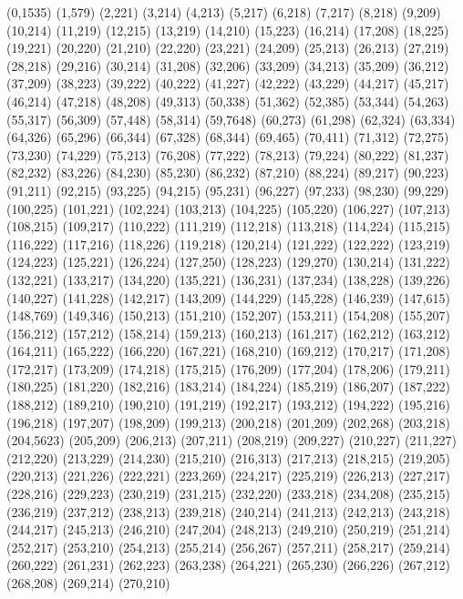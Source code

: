 (0,1535)
(1,579)
(2,221)
(3,214)
(4,213)
(5,217)
(6,218)
(7,217)
(8,218)
(9,209)
(10,214)
(11,219)
(12,215)
(13,219)
(14,210)
(15,223)
(16,214)
(17,208)
(18,225)
(19,221)
(20,220)
(21,210)
(22,220)
(23,221)
(24,209)
(25,213)
(26,213)
(27,219)
(28,218)
(29,216)
(30,214)
(31,208)
(32,206)
(33,209)
(34,213)
(35,209)
(36,212)
(37,209)
(38,223)
(39,222)
(40,222)
(41,227)
(42,222)
(43,229)
(44,217)
(45,217)
(46,214)
(47,218)
(48,208)
(49,313)
(50,338)
(51,362)
(52,385)
(53,344)
(54,263)
(55,317)
(56,309)
(57,448)
(58,314)
(59,7648)
(60,273)
(61,298)
(62,324)
(63,334)
(64,326)
(65,296)
(66,344)
(67,328)
(68,344)
(69,465)
(70,411)
(71,312)
(72,275)
(73,230)
(74,229)
(75,213)
(76,208)
(77,222)
(78,213)
(79,224)
(80,222)
(81,237)
(82,232)
(83,226)
(84,230)
(85,230)
(86,232)
(87,210)
(88,224)
(89,217)
(90,223)
(91,211)
(92,215)
(93,225)
(94,215)
(95,231)
(96,227)
(97,233)
(98,230)
(99,229)
(100,225)
(101,221)
(102,224)
(103,213)
(104,225)
(105,220)
(106,227)
(107,213)
(108,215)
(109,217)
(110,222)
(111,219)
(112,218)
(113,218)
(114,224)
(115,215)
(116,222)
(117,216)
(118,226)
(119,218)
(120,214)
(121,222)
(122,222)
(123,219)
(124,223)
(125,221)
(126,224)
(127,250)
(128,223)
(129,270)
(130,214)
(131,222)
(132,221)
(133,217)
(134,220)
(135,221)
(136,231)
(137,234)
(138,228)
(139,226)
(140,227)
(141,228)
(142,217)
(143,209)
(144,229)
(145,228)
(146,239)
(147,615)
(148,769)
(149,346)
(150,213)
(151,210)
(152,207)
(153,211)
(154,208)
(155,207)
(156,212)
(157,212)
(158,214)
(159,213)
(160,213)
(161,217)
(162,212)
(163,212)
(164,211)
(165,222)
(166,220)
(167,221)
(168,210)
(169,212)
(170,217)
(171,208)
(172,217)
(173,209)
(174,218)
(175,215)
(176,209)
(177,204)
(178,206)
(179,211)
(180,225)
(181,220)
(182,216)
(183,214)
(184,224)
(185,219)
(186,207)
(187,222)
(188,212)
(189,210)
(190,210)
(191,219)
(192,217)
(193,212)
(194,222)
(195,216)
(196,218)
(197,207)
(198,209)
(199,213)
(200,218)
(201,209)
(202,268)
(203,218)
(204,5623)
(205,209)
(206,213)
(207,211)
(208,219)
(209,227)
(210,227)
(211,227)
(212,220)
(213,229)
(214,230)
(215,210)
(216,313)
(217,213)
(218,215)
(219,205)
(220,213)
(221,226)
(222,221)
(223,269)
(224,217)
(225,219)
(226,213)
(227,217)
(228,216)
(229,223)
(230,219)
(231,215)
(232,220)
(233,218)
(234,208)
(235,215)
(236,219)
(237,212)
(238,213)
(239,218)
(240,214)
(241,213)
(242,213)
(243,218)
(244,217)
(245,213)
(246,210)
(247,204)
(248,213)
(249,210)
(250,219)
(251,214)
(252,217)
(253,210)
(254,213)
(255,214)
(256,267)
(257,211)
(258,217)
(259,214)
(260,222)
(261,231)
(262,223)
(263,238)
(264,221)
(265,230)
(266,226)
(267,212)
(268,208)
(269,214)
(270,210)
